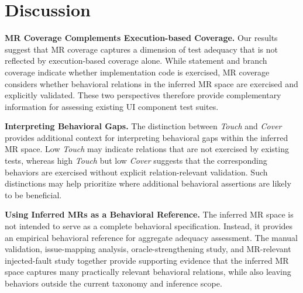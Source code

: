 \section{Discussion}\label{sec:discussion}
\noindent\textbf{MR Coverage Complements Execution-based Coverage.}
Our results suggest that MR coverage captures a dimension of test adequacy that is not reflected by execution-based coverage alone. While statement and branch coverage indicate whether implementation code is exercised, MR coverage considers whether behavioral relations in the inferred MR space are exercised and explicitly validated. These two perspectives therefore provide complementary information for assessing existing UI component test suites.

\noindent\textbf{Interpreting Behavioral Gaps.}
The distinction between \textit{Touch} and \textit{Cover} provides additional context for interpreting behavioral gaps within the inferred MR space. Low \textit{Touch} may indicate relations that are not exercised by existing tests, whereas high \textit{Touch} but low \textit{Cover} suggests that the corresponding behaviors are exercised without explicit relation-relevant validation. Such distinctions may help prioritize where additional behavioral assertions are likely to be beneficial.

\noindent\textbf{Using Inferred MRs as a Behavioral Reference.}
The inferred MR space is not intended to serve as a complete behavioral specification. Instead, it provides an empirical behavioral reference for aggregate adequacy assessment. The manual validation, issue-mapping analysis, oracle-strengthening study, and MR-relevant injected-fault study together provide supporting evidence that the inferred MR space captures many practically relevant behavioral relations, while also leaving behaviors outside the current taxonomy and inference scope.
